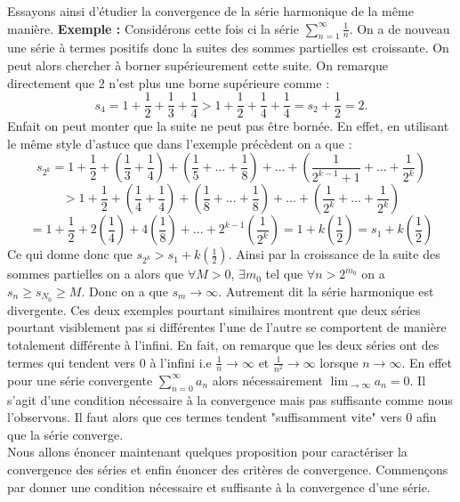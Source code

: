 \documentclass[a4paper, 12pt, french, twoside]{article}
\begin{document}
Essayons ainsi d'étudier la convergence de la série harmonique de la même manière. 
 \newline
\textbf{Exemple :} Considérons cette fois ci la série $\sum_{n=1}^{\infty} \frac{1}{n}$. On a de nouveau une série à termes positifs donc la suites des sommes partielles est croissante. On peut alors chercher à borner supérieurement cette suite. On remarque directement que 2 n'est plus une borne supérieure comme :
$$ s_4 = 1 + \frac{1}{2} + \frac{1}{3} + \frac{1}{4} > 1 + \frac{1}{2} + \frac{1}{4} + \frac{1}{4} = s_2 + \frac{1}{2} = 2. $$ 
Enfait on peut monter que la suite ne peut pas être bornée. En effet, en utilisant le même style d'astuce que dans l'exemple précèdent on a que :
$$ s_{2^k} = 1 + \frac{1}{2} + \left (\frac{1}{3}+ \frac{1}{4} \right ) + \left( \frac{1}{5} + ... + \frac{1}{8} \right ) + ... + \left( \frac{1}{2^{k-1}+1} + ... + \frac{1}{2^k} \right ) $$
$$ >  1 + \frac{1}{2} + \left (\frac{1}{4}+ \frac{1}{4} \right ) + \left( \frac{1}{8} + ... + \frac{1}{8} \right ) + ... + \left( \frac{1}{2^{k}} + ... + \frac{1}{2^k} \right ) $$
$$ =  1 + \frac{1}{2} + 2\left (\frac{1}{4} \right ) + 4\left( \frac{1}{8} \right ) + ... + 2^{k-1} \left( \frac{1}{2^{k}} \right ) = 1 + k \left (\frac{1}{2} \right ) = s_1 + k \left (\frac{1}{2} \right )$$
Ce qui donne donc que $s_{2^k} >  s_1 + k \left (\frac{1}{2} \right ) $. Ainsi par la croissance de la suite des sommes partielles on a alors que $\forall M > 0$, $\exists m_0$ tel que $\forall n > 2^{m_0}$ on a $s_n \ge s_{N_0} \ge M$. Donc on a que $s_m \rightarrow \infty$. Autrement dit la série harmonique est divergente. \newline 
Ces deux exemples pourtant similaires montrent que deux séries pourtant visiblement pas si différentes l'une de l'autre se comportent de manière totalement différente à l'infini. En fait, on remarque que les deux séries ont des termes qui tendent vers 0 à l'infini i.e $\frac{1}{n} \rightarrow \infty$ et $\frac{1}{n^2} \rightarrow \infty$ lorsque $n \rightarrow \infty$. En effet pour une série convergente $\sum_{n=0}^{\infty} a_n$ alors nécessairement $\lim_{\to \infty} a_n = 0$. Il s'agit d'une condition nécessaire à la convergence mais pas suffisante comme nous l'observons. Il faut alors que ces termes tendent "suffisamment vite" vers 0 afin que la série converge. 
\newline
\\Nous allons énoncer maintenant quelques proposition pour caractériser la convergence des séries et enfin énoncer des critères de convergence.
Commençons par donner une condition nécessaire et suffisante à la convergence d'une série.
\end{document}
